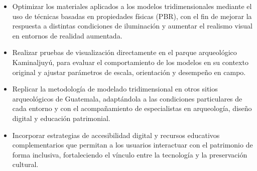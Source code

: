 
\begin{itemize}
    \item Optimizar los materiales aplicados a los modelos tridimensionales mediante el uso de técnicas basadas en propiedades físicas (\gls{PBR}), con el fin de mejorar la respuesta a distintas condiciones de iluminación y aumentar el realismo visual en entornos de realidad aumentada.

    \item Realizar pruebas de visualización directamente en el parque arqueológico Kaminaljuyú, para evaluar el comportamiento de los modelos en su contexto original y ajustar parámetros de escala, orientación y desempeño en campo.

    \item Replicar la metodología de modelado tridimensional en otros sitios arqueológicos de Guatemala, adaptándola a las condiciones particulares de cada entorno y con el acompañamiento de especialistas en arqueología, diseño digital y educación patrimonial.

    \item Incorporar estrategias de accesibilidad digital y recursos educativos complementarios que permitan a los usuarios interactuar con el patrimonio de forma inclusiva, fortaleciendo el vínculo entre la tecnología y la preservación cultural.
\end{itemize}
